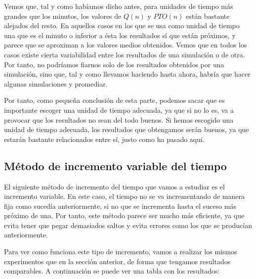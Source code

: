 \documentclass[11pt,a4paper]{article}
\begin{document}
Vemos que, tal y como habíamos dicho antes, para unidades de tiempo más grandes
que los minutos, los valores de $Q(n)$ y $PTO(n)$ están bastante alejados del resto.
En aquellos casos en los que se usa como unidad de tiempo una que es el minuto
o inferior a ésta los resultados sí que están próximos, y parece que se aproximan
a los valores medios obtenidos. Vemos que en todos los casos existe cierta variabilidad
entre los resultados de una simulación o de otra. Por tanto, no podríamos fiarnos solo
de los resultados obtenidos por una simulación, sino que, tal y como llevamos haciendo
hasta ahora, habría que hacer algunas simulaciones y promediar.

Por tanto, como pequeña conclusión de esta parte, podemos sacar que es importante
escoger una unidad de tiempo adecuada, ya que si no lo es, va a provocar que
los resultados no sean del todo buenos. Si hemos escogido una unidad de
tiempo adecuada, los resultados que obtengamos serán buenos, ya que estarán bastante
relacionados entre sí, justo como ha pasado aquí.

\subsection{Método de incremento variable del tiempo}

El siguiente método de incremento del tiempo que vamos a estudiar es el incremento
variable. En este caso, el tiempo no se va incrementando de manera fija como sucedía
anteriormente, si no que se incrementa hasta el suceso más próximo de una. Por
tanto, este método parece ser mucho más eficiente, ya que evita tener que pegar demasiados
saltos y evita errores como los que se producían anteriormente.

Para ver como funciona este tipo de incremento, vamos a realizar los mismos experimentos
que en la sección anterior, de forma que tengamos resultados comparables. A continuación
se puede ver una tabla con los resultados:
\end{document}
